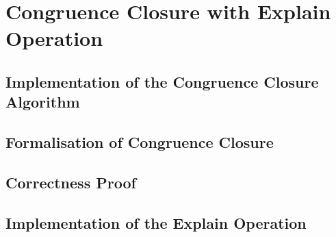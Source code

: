 
\chapter{Congruence Closure with Explain Operation}\label{chapter:congruence_closure}

\section{Implementation of the Congruence Closure Algorithm}

\section{Formalisation of Congruence Closure}

\section{Correctness Proof}

\section{Implementation of the Explain Operation}
